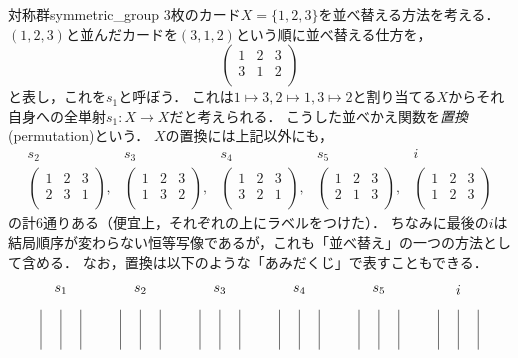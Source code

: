 \documentclass[11pt,a4paper]{jsarticle}
\begin{document}
\begin{rei}{対称群}{symmetric_group}
    3枚のカード$X = \{1, 2, 3 \}$を並べ替える方法を考える．$(1,2,3)$と並んだカードを$(3,1,2)$という順に並べ替える仕方を，
    \[ \begin{pmatrix}
        1 & 2 & 3 \\
        3 & 1 & 2 \\
    \end{pmatrix}\]
    と表し，これを$s_1$と呼ぼう．
    これは$1 \mapsto 3, 2 \mapsto 1, 3 \mapsto 2$と割り当てる$X$からそれ自身への全単射$s_1:X \to X$だと考えられる．
    こうした並べかえ関数を\emph{置換}(permutation)という．
    $X$の置換には上記以外にも，
    \[\begin{array}{ccccc}
        s_2 & s_3 & s_4 & s_5 & i \\
    \begin{pmatrix}
        1 & 2 & 3 \\
        2 & 3 & 1 \\
    \end{pmatrix}, &
    \begin{pmatrix}
        1 & 2 & 3 \\
        1 & 3 & 2 \\
    \end{pmatrix}, &
    \begin{pmatrix}
        1 & 2 & 3 \\
        3 & 2 & 1 \\
    \end{pmatrix}, &
    \begin{pmatrix}
        1 & 2 & 3 \\
        2 & 1 & 3 \\
    \end{pmatrix}, &
    \begin{pmatrix}
        1 & 2 & 3 \\
        1 & 2 & 3 \\
    \end{pmatrix}\end{array}\]
    の計6通りある（便宜上，それぞれの上にラベルをつけた）．
    ちなみに最後の$i$は結局順序が変わらない恒等写像であるが，これも「並べ替え」の一つの方法として含める．
    なお，置換は以下のような「あみだくじ」で表すこともできる．
    \[\begin{tikzpicture}
        \foreach \x in {0,.5,1, 2,2.5,3, 4,4.5,5, 6,6.5,7, 8,8.5,9, 10,10.5,11} {
            \draw (\x,0) -- (\x,1);
        }
        \node (s1) at (.5,1.5) {$s_1$};
        \node (s2) at (2.5,1.5) {$s_2$};
        \node (s3) at (4.5,1.5) {$s_3$};
        \node (s4) at (6.5,1.5) {$s_4$};
        \node (s5) at (8.5,1.5) {$s_5$};
        \node (i) at (10.5,1.5) {$i$};
    

\end{tikzpicture}\]
\end{rei}
\end{document}
